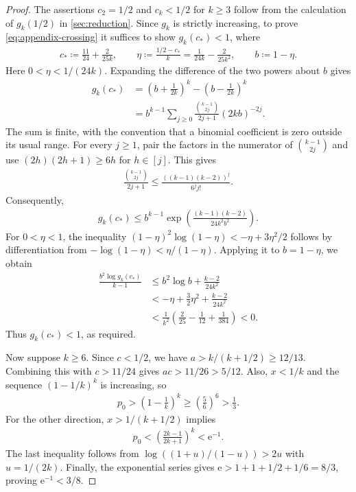 \begin{proof}
The assertions $c_2=1/2$ and $c_k<1/2$ for $k\ge3$ follow from the calculation of $g_k(1/2)$ in \cref{sec:reduction}. Since $g_k$ is strictly increasing, to prove \cref{eq:appendix-crossing} it suffices to show $g_k(c_*)<1$, where
\begin{align*}
c_*\coloneqq\frac{11}{24}+\frac{2}{25k},\qquad
\eta\coloneqq\frac{1/2-c_*}{k}=\frac1{24k}-\frac2{25k^2},\qquad b\coloneqq1-\eta.
\end{align*}
Here $0<\eta<1/(24k)$. Expanding the difference of the two powers about $b$ gives
\begin{align*}
g_k(c_*)&=\left(b+\frac1{2k}\right)^k-\left(b-\frac1{2k}\right)^k\\
&=b^{k-1}\sum_{j\ge0}\frac{\binom{k-1}{2j}}{2j+1}(2kb)^{-2j}.
\end{align*}
The sum is finite, with the convention that a binomial coefficient is zero outside its usual range. For every $j\ge1$, pair the factors in the numerator of $\binom{k-1}{2j}$ and use $(2h)(2h+1)\ge6h$ for $h\in[j]$. This gives
\begin{align*}
\frac{\binom{k-1}{2j}}{2j+1}
\le \frac{((k-1)(k-2))^j}{6^j j!}.
\end{align*}
Consequently,
\begin{align*}
g_k(c_*)\le b^{k-1}\exp\left(\frac{(k-1)(k-2)}{24k^2b^2}\right).
\end{align*}
For $0<\eta<1$, the inequality $(1-\eta)^2\log(1-\eta)<-\eta+3\eta^2/2$ follows by differentiation from $-\log(1-\eta)<\eta/(1-\eta)$. Applying it to $b=1-\eta$, we obtain
\begin{align*}
\frac{b^2\log g_k(c_*)}{k-1}
&\le b^2\log b+\frac{k-2}{24k^2}\\
&< -\eta+\frac32\eta^2+\frac{k-2}{24k^2}\\
&<\frac1{k^2}\left(\frac2{25}-\frac1{12}+\frac1{384}\right)<0.
\end{align*}
Thus $g_k(c_*)<1$, as required.

Now suppose $k\ge6$. Since $c<1/2$, we have $a>k/(k+1/2)\ge12/13$. Combining this with $c>11/24$ gives $ac>11/26>5/12$. Also, $x<1/k$ and the sequence $(1-1/k)^k$ is increasing, so
\begin{align*}
p_0>\left(1-\frac1k\right)^k\ge\left(\frac56\right)^6>\frac13.
\end{align*}
For the other direction, $x>1/(k+1/2)$ implies
\begin{align*}
p_0<\left(\frac{2k-1}{2k+1}\right)^k<\mathrm e^{-1}.
\end{align*}
The last inequality follows from $\log((1+u)/(1-u))>2u$ with $u=1/(2k)$. Finally, the exponential series gives $\mathrm e>1+1+1/2+1/6=8/3$, proving $\mathrm e^{-1}<3/8$.
\end{proof}

